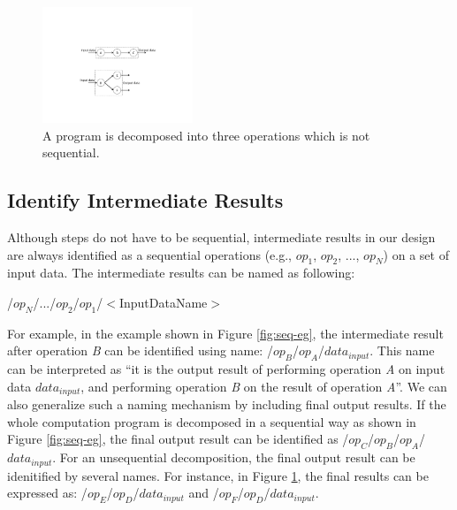 \begin{figure}
\begin{center}
\includegraphics[width=0.4\textwidth]{fig-p-r/non-seq-eg.pdf}
\end{center}
\caption{A program is decomposed into three operations which is not sequential.}
\label{fig:non-seq-eg}
\end{figure}

\subsection{Identify Intermediate Results}
Although steps do not have to be sequential, intermediate results in our design are always identified as a sequential operations (e.g., $op_1$, $op_2$, ..., $op_N$) on a set of input data.  
The intermediate results can be named as following:
\begin{center}
/$op_N$/.../$op_2$/$op_1$/$<$InputDataName$>$
\end{center}
For example, in the example shown in Figure \ref{fig:seq-eg}, the intermediate result after operation {\it B} can be identified using name: /$op_B$/$op_A$/$data_{input}$.  
This name can be interpreted as ``it is the output result of performing operation {\it A} on input data $data_{input}$, and performing operation {\it B} on the result of operation {\it A}''.  
We can also generalize such a naming mechanism by including final output results.  
If the whole computation program is decomposed in a sequential way as shown in Figure \ref{fig:seq-eg}, the final output result can be identified as /$op_C$/$op_B$/$op_A$/$data_{input}$.  
For an unsequential decomposition, the final output result can be idenitified by several names.  
For instance, in Figure \ref{fig:non-seq-eg}, the final results can be expressed as:
/$op_E$/$op_D$/$data_{input}$ and /$op_F$/$op_D$/$data_{input}$.

